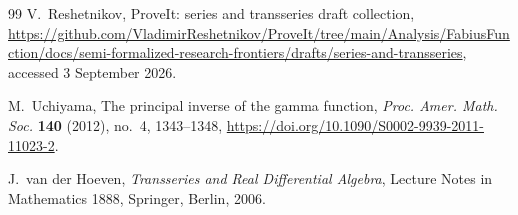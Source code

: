 \documentclass[11pt,a4paper]{article}
\numberwithin{equation}{section}
\theoremstyle{definition}
\theoremstyle{remark}
\begin{document}
\begin{thebibliography}{99}
V.~Reshetnikov,
\newblock ProveIt: series and transseries draft collection,
\newblock \url{https://github.com/VladimirReshetnikov/ProveIt/tree/main/Analysis/FabiusFunction/docs/semi-formalized-research-frontiers/drafts/series-and-transseries},
\newblock accessed 3 September 2026.

M.~Uchiyama,
\newblock The principal inverse of the gamma function,
\newblock \emph{Proc. Amer. Math. Soc.} \textbf{140} (2012), no.~4,
1343--1348,
\newblock \url{https://doi.org/10.1090/S0002-9939-2011-11023-2}.

J.~van der Hoeven,
\newblock \emph{Transseries and Real Differential Algebra},
\newblock Lecture Notes in Mathematics 1888, Springer, Berlin, 2006.

\end{thebibliography}
\end{document}

